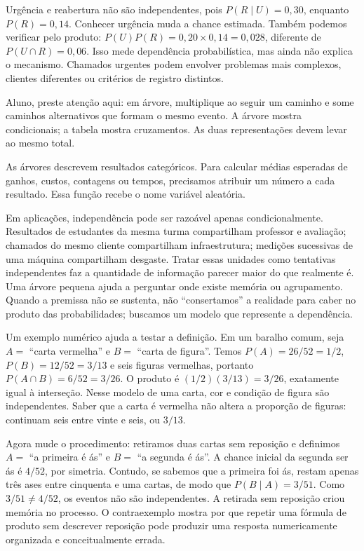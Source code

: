 Urgência e reabertura não são independentes, pois $P(R\mid U)=0{,}30$, enquanto $P(R)=0{,}14$. Conhecer urgência muda a chance estimada. Também podemos verificar pelo produto: $P(U)P(R)=0{,}20\times0{,}14=0{,}028$, diferente de $P(U\cap R)=0{,}06$. Isso mede dependência probabilística, mas ainda não explica o mecanismo. Chamados urgentes podem envolver problemas mais complexos, clientes diferentes ou critérios de registro distintos.

\begin{GuidedBox}
Aluno, preste atenção aqui: em árvore, multiplique ao seguir um caminho e some caminhos alternativos que formam o mesmo evento. A árvore mostra condicionais; a tabela mostra cruzamentos. As duas representações devem levar ao mesmo total.
\end{GuidedBox}

As árvores descrevem resultados categóricos. Para calcular médias esperadas de ganhos, custos, contagens ou tempos, precisamos atribuir um número a cada resultado. Essa função recebe o nome variável aleatória.

Em aplicações, independência pode ser razoável apenas condicionalmente. Resultados de estudantes da mesma turma compartilham professor e avaliação; chamados do mesmo cliente compartilham infraestrutura; medições sucessivas de uma máquina compartilham desgaste. Tratar essas unidades como tentativas independentes faz a quantidade de informação parecer maior do que realmente é. Uma árvore pequena ajuda a perguntar onde existe memória ou agrupamento. Quando a premissa não se sustenta, não ``consertamos'' a realidade para caber no produto das probabilidades; buscamos um modelo que represente a dependência.

Um exemplo numérico ajuda a testar a definição. Em um baralho comum, seja $A=$ ``carta vermelha'' e $B=$ ``carta de figura''. Temos $P(A)=26/52=1/2$, $P(B)=12/52=3/13$ e seis figuras vermelhas, portanto $P(A\cap B)=6/52=3/26$. O produto é $(1/2)(3/13)=3/26$, exatamente igual à interseção. Nesse modelo de uma carta, cor e condição de figura são independentes. Saber que a carta é vermelha não altera a proporção de figuras: continuam seis entre vinte e seis, ou $3/13$.

Agora mude o procedimento: retiramos duas cartas sem reposição e definimos $A=$ ``a primeira é ás'' e $B=$ ``a segunda é ás''. A chance inicial da segunda ser ás é $4/52$, por simetria. Contudo, se sabemos que a primeira foi ás, restam apenas três ases entre cinquenta e uma cartas, de modo que $P(B\mid A)=3/51$. Como $3/51\neq4/52$, os eventos não são independentes. A retirada sem reposição criou memória no processo. O contraexemplo mostra por que repetir uma fórmula de produto sem descrever reposição pode produzir uma resposta numericamente organizada e conceitualmente errada.

